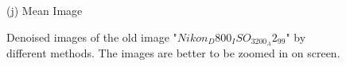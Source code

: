 \documentclass[10pt,twocolumn,letterpaper]{article}
\begin{document}
\begin{figure}
{\begin{minipage}[t]{0.2\textwidth}
{\footnotesize (j) Mean Image }
\end{minipage}
}
\caption{Denoised images of the old image "$Nikon_D800_ISO_3200_A2_99$" by different methods. The images are better to be zoomed in on screen.}
\label{fig2}
\end{figure}

\begin{figure}
\centering
{}
\end{figure}
\end{document}
